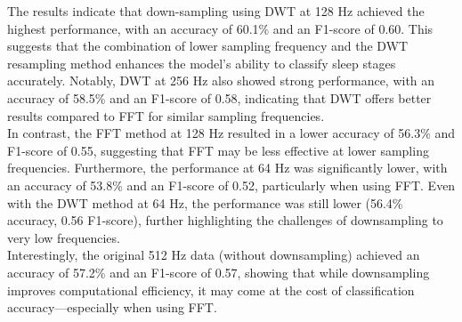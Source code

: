 \begin{table}[H]
    \centering
    \caption{Performance of sleep stage classification using different sampling frequencies and resampling methods.}
    \label{tab:effect_of_frequency}
\end{table}

The results indicate that down-sampling using DWT at 128 Hz achieved the highest performance, with an accuracy of 60.1\% and an F1-score of 0.60. This suggests that the combination of lower sampling frequency and the DWT resampling method enhances the model's ability to classify sleep stages accurately. Notably, DWT at 256 Hz also showed strong performance, with an accuracy of 58.5\% and an F1-score of 0.58, indicating that DWT offers better results compared to FFT for similar sampling frequencies. \\

In contrast, the FFT method at 128 Hz resulted in a lower accuracy of 56.3\% and F1-score of 0.55, suggesting that FFT may be less effective at lower sampling frequencies. Furthermore, the performance at 64 Hz was significantly lower, with an accuracy of 53.8\% and an F1-score of 0.52, particularly when using FFT. Even with the DWT method at 64 Hz, the performance was still lower (56.4\% accuracy, 0.56 F1-score), further highlighting the challenges of downsampling to very low frequencies. \\

Interestingly, the original 512 Hz data (without downsampling) achieved an accuracy of 57.2\% and an F1-score of 0.57, showing that while downsampling improves computational efficiency, it may come at the cost of classification accuracy—especially when using FFT. \\

